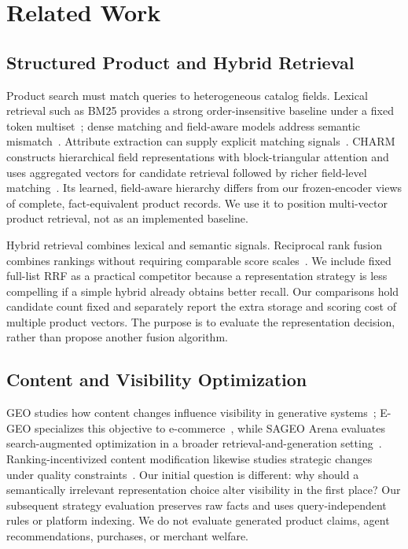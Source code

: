 \section{Related Work}
\subsection{Structured Product and Hybrid Retrieval}
Product search must match queries to heterogeneous catalog fields. Lexical retrieval such as BM25 provides a strong order-insensitive baseline under a fixed token multiset~\cite{robertson2009bm25}; dense matching and field-aware models address semantic mismatch~\cite{choi2020semantic}. Attribute extraction can supply explicit matching signals~\cite{loughnane2024attributes}. CHARM constructs hierarchical field representations with block-triangular attention and uses aggregated vectors for candidate retrieval followed by richer field-level matching~\cite{freymuth2025charm}. Its learned, field-aware hierarchy differs from our frozen-encoder views of complete, fact-equivalent product records. We use it to position multi-vector product retrieval, not as an implemented baseline.

Hybrid retrieval combines lexical and semantic signals. Reciprocal rank fusion combines rankings without requiring comparable score scales~\cite{cormack2009rrf}. We include fixed full-list RRF as a practical competitor because a representation strategy is less compelling if a simple hybrid already obtains better recall. Our comparisons hold candidate count fixed and separately report the extra storage and scoring cost of multiple product vectors. The purpose is to evaluate the representation decision, rather than propose another fusion algorithm.

\subsection{Content and Visibility Optimization}
GEO studies how content changes influence visibility in generative systems~\cite{aggarwal2024geo}; E-GEO specializes this objective to e-commerce~\cite{bagga2025egeo}, while SAGEO Arena evaluates search-augmented optimization in a broader retrieval-and-generation setting~\cite{kim2026sageo}. Ranking-incentivized content modification likewise studies strategic changes under quality constraints~\cite{goren2020ranking}. Our initial question is different: why should a semantically irrelevant representation choice alter visibility in the first place? Our subsequent strategy evaluation preserves raw facts and uses query-independent rules or platform indexing. We do not evaluate generated product claims, agent recommendations, purchases, or merchant welfare.

